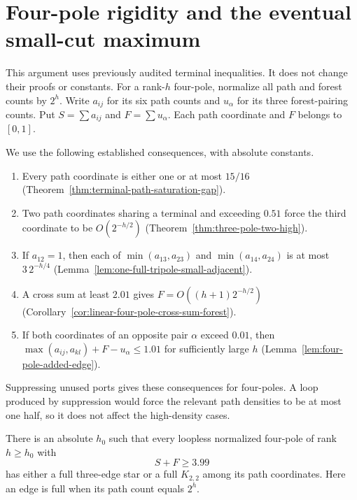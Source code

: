 \section{Four-pole rigidity and the eventual small-cut maximum}
\label{sec:four-coefficient-rigidity}

This argument uses previously audited terminal inequalities.
It does not change their proofs or constants.
For a rank-$h$ four-pole, normalize all path and forest counts by $2^h$.
Write $a_{ij}$ for its six path counts and $u_\alpha$ for its three forest-pairing counts.
Put $S=\sum a_{ij}$ and $F=\sum u_\alpha$.
Each path coordinate and $F$ belongs to $[0,1]$.

We use the following established consequences, with absolute constants.
\begin{enumerate}
\item Every path coordinate is either one or at most $15/16$
      (Theorem~\ref{thm:terminal-path-saturation-gap}).
\item Two path coordinates sharing a terminal and exceeding $0.51$ force the third coordinate to be $O(2^{-h/2})$
      (Theorem~\ref{thm:three-pole-two-high}).
\item If $a_{12}=1$, then each of $\min(a_{13},a_{23})$ and $\min(a_{14},a_{24})$ is at most $3\,2^{-h/4}$
      (Lemma~\ref{lem:one-full-tripole-small-adjacent}).
\item A cross sum at least $2.01$ gives $F=O((h+1)2^{-h/2})$
      (Corollary~\ref{cor:linear-four-pole-cross-sum-forest}).
\item If both coordinates of an opposite pair $\alpha$ exceed $0.01$, then
      $\max(a_{ij},a_{kl})+F-u_\alpha\le1.01$ for sufficiently large $h$
      (Lemma~\ref{lem:four-pole-added-edge}).
\end{enumerate}
Suppressing unused ports gives these consequences for four-poles.
A loop produced by suppression would force the relevant path densities to be at most one half, so it does not affect the high-density cases.

\begin{lemma}
\label{lem:four-coefficient-aggregate-rigidity}
There is an absolute $h_0$ such that every loopless normalized four-pole of rank $h\ge h_0$ with
\[
 S+F\ge3.99
\]
has either a full three-edge star or a full $K_{2,2}$ among its path coordinates.
Here an edge is full when its path count equals $2^h$.
\end{lemma}

